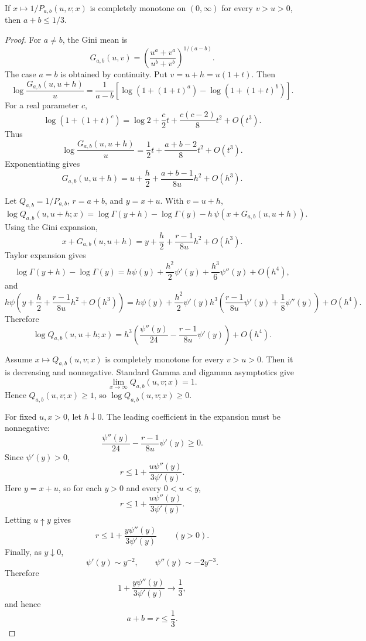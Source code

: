 \begin{lemma}
\label{res:ab-reciprocal-sum-gate-a-plus-b-le-one-third}
If \(x\mapsto1/P_{a,b}(u,v;x)\) is completely monotone on \((0,\infty)\) for every \(v>u>0\), then \(a+b\le1/3\).
\end{lemma}
\begin{proof}
For \(a\ne b\), the Gini mean is
\[
G_{a,b}(u,v)
=\left(\frac{u^a+v^a}{u^b+v^b}\right)^{1/(a-b)}.
\]
The case \(a=b\) is obtained by continuity. Put \(v=u+h=u(1+t)\). Then
\[
\log \frac{G_{a,b}(u,u+h)}{u}
=\frac{1}{a-b}
\left[
\log(1+(1+t)^a)-\log(1+(1+t)^b)
\right].
\]
For a real parameter \(c\),
\[
\log(1+(1+t)^c)
=\log2+\frac c2t+\frac{c(c-2)}8t^2+O(t^3).
\]
Thus
\[
\log \frac{G_{a,b}(u,u+h)}{u}
=\frac12t+\frac{a+b-2}{8}t^2+O(t^3).
\]
Exponentiating gives
\[
G_{a,b}(u,u+h)
=u+\frac h2+\frac{a+b-1}{8u}h^2+O(h^3).
\]

Let \(Q_{a,b}=1/P_{a,b}\), \(r=a+b\), and \(y=x+u\). With \(v=u+h\),
\[
\log Q_{a,b}(u,u+h;x)
=\log\Gamma(y+h)-\log\Gamma(y)
-h\,\psi(x+G_{a,b}(u,u+h)).
\]
Using the Gini expansion,
\[
x+G_{a,b}(u,u+h)
=y+\frac h2+\frac{r-1}{8u}h^2+O(h^3).
\]
Taylor expansion gives
\[
\log\Gamma(y+h)-\log\Gamma(y)
=h\psi(y)+\frac{h^2}{2}\psi'(y)+\frac{h^3}{6}\psi''(y)+O(h^4),
\]
and
\[
h\psi\left(y+\frac h2+\frac{r-1}{8u}h^2+O(h^3)\right)
=h\psi(y)+\frac{h^2}{2}\psi'(y)
h^3\left(\frac{r-1}{8u}\psi'(y)+\frac18\psi''(y)\right)+O(h^4).
\]
Therefore
\[
\log Q_{a,b}(u,u+h;x)
=h^3\left(
\frac{\psi''(y)}{24}
-\frac{r-1}{8u}\psi'(y)
\right)+O(h^4).
\]

Assume \(x\mapsto Q_{a,b}(u,v;x)\) is completely monotone for every \(v>u>0\). Then it is decreasing and nonnegative. Standard Gamma and digamma asymptotics give
\[
\lim_{x\to\infty}Q_{a,b}(u,v;x)=1.
\]
Hence \(Q_{a,b}(u,v;x)\ge1\), so \(\log Q_{a,b}(u,v;x)\ge0\).

For fixed \(u,x>0\), let \(h\downarrow0\). The leading coefficient in the expansion must be nonnegative:
\[
\frac{\psi''(y)}{24}
-\frac{r-1}{8u}\psi'(y)
\ge0.
\]
Since \(\psi'(y)>0\),
\[
r\le 1+\frac{u\psi''(y)}{3\psi'(y)}.
\]
Here \(y=x+u\), so for each \(y>0\) and every \(0<u<y\),
\[
r\le 1+\frac{u\psi''(y)}{3\psi'(y)}.
\]
Letting \(u\uparrow y\) gives
\[
r\le 1+\frac{y\psi''(y)}{3\psi'(y)}
\qquad (y>0).
\]
Finally, as \(y\downarrow0\),
\[
\psi'(y)\sim y^{-2},
\qquad
\psi''(y)\sim -2y^{-3}.
\]
Therefore
\[
1+\frac{y\psi''(y)}{3\psi'(y)}\to \frac13,
\]
and hence
\[
a+b=r\le \frac13.
\]
\end{proof}

